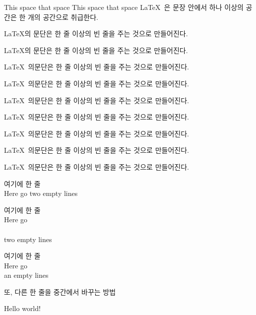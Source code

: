 \documentclass[11pt]{article}
\begin{document}
This space that space                  This space that    space
\LaTeX \       은 문장 안에서 하나   이상의 공간은
한 개의 공간으로 취급한다.

\LaTeX 의    문단은 한 줄 
이상의 빈 줄을 주는
것으로 만들어진다.

\setlength{\parindent}{5cm} \LaTeX 의    문단은 한 줄 
이상의 빈 줄을 주는
것으로 만들어진다.

\setlength{\parindent}{0cm}\LaTeX \ 의문단은 한 줄 이상의 빈 줄을 주는 것으로 만들어진다.

\LaTeX \ 의문단은 한 줄 이상의 빈 줄을 주는 것으로 만들어진다.

\setlength{\parindent}{5cm}
\LaTeX \ 의문단은 한 줄 이상의 빈 줄을 주는 것으로 만들어진다.

\LaTeX \ 의문단은 한 줄 이상의 빈 줄을 주는 것으로 만들어진다.

\noindent
\LaTeX \ 의문단은 한 줄 이상의 빈 줄을 주는 것으로 만들어진다.

\parskip=2cm
\parindent=1cm
\LaTeX \ 의문단은 한 줄 이상의 빈 줄을 주는 것으로 만들어진다.

\LaTeX \ 의문단은 한 줄 이상의 빈 줄을 주는 것으로 만들어진다.

여기에 \newline \newline 한 줄\\
Here go \newline \null
\newline two empty lines

여기에 \newline 한 줄 \\
Here go \\ \\
two empty lines

여기에 한 줄 \\[2cm]
Here go \\ an empty lines

또, 다른 한 줄을 \linebreak 중간에서 바꾸는 방법

\newpage \null
\newpage

Hello world!
\end{document}
